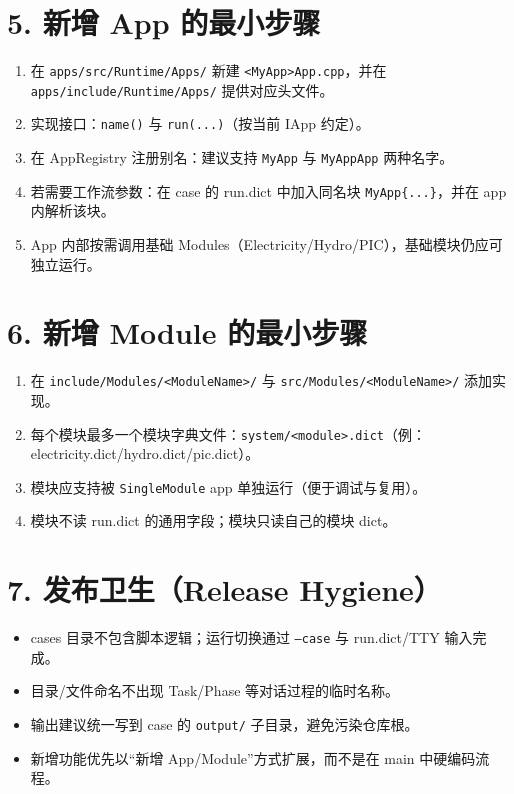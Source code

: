 \documentclass[UTF8,a4paper,11pt]{ctexart}
\begin{document}
\section*{5. 新增 App 的最小步骤}
\begin{enumerate}
\item 在 \texttt{apps/src/Runtime/Apps/} 新建 \texttt{<MyApp>App.cpp}，并在 \texttt{apps/include/Runtime/Apps/} 提供对应头文件。
\item 实现接口：\texttt{name()} 与 \texttt{run(...)}（按当前 IApp 约定）。
\item 在 AppRegistry 注册别名：建议支持 \texttt{MyApp} 与 \texttt{MyAppApp} 两种名字。
\item 若需要工作流参数：在 case 的 run.dict 中加入同名块 \texttt{MyApp\{...\}}，并在 app 内解析该块。
\item App 内部按需调用基础 Modules（Electricity/Hydro/PIC），基础模块仍应可独立运行。
\end{enumerate}

\section*{6. 新增 Module 的最小步骤}
\begin{enumerate}
\item 在 \texttt{include/Modules/<ModuleName>/} 与 \texttt{src/Modules/<ModuleName>/} 添加实现。
\item 每个模块最多一个模块字典文件：\texttt{system/<module>.dict}（例：electricity.dict/hydro.dict/pic.dict）。
\item 模块应支持被 \texttt{SingleModule} app 单独运行（便于调试与复用）。
\item 模块不读 run.dict 的通用字段；模块只读自己的模块 dict。
\end{enumerate}

\section*{7. 发布卫生（Release Hygiene）}
\begin{itemize}
\item cases 目录不包含脚本逻辑；运行切换通过 \texttt{--case} 与 run.dict/TTY 输入完成。
\item 目录/文件命名不出现 Task/Phase 等对话过程的临时名称。
\item 输出建议统一写到 case 的 \texttt{output/} 子目录，避免污染仓库根。
\item 新增功能优先以“新增 App/Module”方式扩展，而不是在 main 中硬编码流程。
\end{itemize}
\end{document}
